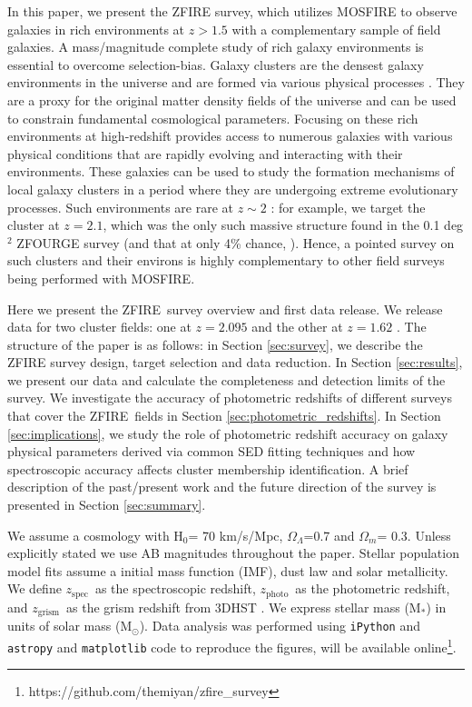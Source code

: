 \documentclass[iop]{emulateapj}
\newcommand{\zspec}{$z_{\mathrm{spec}}$}
\newcommand{\zgrism}{$z_{\mathrm{grism}}$}
\newcommand{\zphoto}{$z_{\mathrm{photo}}$}
\begin{document}
In this paper, we present the ZFIRE survey, which utilizes MOSFIRE to  observe galaxies in rich environments at $z>1.5$ with a complementary sample of field galaxies. A mass/magnitude complete study of rich galaxy environments is essential to overcome selection-bias.
Galaxy clusters are the densest galaxy environments in the universe and are formed via various physical processes \citep{Kravtsov2012}. 
They are a proxy for the original matter density fields of the universe and can be used to constrain fundamental cosmological parameters. Focusing on these rich environments at high-redshift provides access to numerous galaxies with various physical conditions that are rapidly evolving and interacting with their environments. 
These galaxies can be used to study the formation mechanisms of local galaxy clusters in a period where they are undergoing extreme evolutionary processes. Such environments are rare at $z\sim 2$ \citep{Gobat2011,Newman2014,Yuan2014}: for example, we target the \cite{Spitler2012} cluster at $z=2.1$, which was the only such massive structure found in the 0.1 deg$^2$  ZFOURGE survey (and that at only  4\% chance, \citep{Yuan2014}). Hence, a pointed survey on such clusters and their environs is highly complementary to  other field surveys being performed with MOSFIRE.


Here we present the ZFIRE\ survey overview and  first data release. 
We release data for two cluster fields: one at $z=2.095$ \citep{Spitler2012,Yuan2014} and the other at $z=1.62$ \citep{Papovich2010,Tanaka2010}. 
The structure of the paper is as follows: 
in Section \ref{sec:survey}, we describe the ZFIRE survey design, target selection and data reduction.  
In Section \ref{sec:results}, we present our data and calculate the completeness and detection limits of the survey. 
We investigate the accuracy of photometric redshifts  of different surveys that cover the ZFIRE\ fields in Section \ref{sec:photometric_redshifts}. In Section \ref{sec:implications}, we  study the role of photometric redshift accuracy on galaxy physical parameters derived via common SED fitting techniques and how spectroscopic accuracy affects cluster membership identification. 
A brief description of the past/present work and the future direction of the survey is presented in Section \ref{sec:summary}. 
 


We assume a cosmology with H$_0$= 70 km/s/Mpc, $\Omega_\Lambda$=0.7 and $\Omega_m$= 0.3. 
Unless explicitly stated we use AB magnitudes throughout the paper. 
Stellar population model fits assume a \citet{Chabrier2003} initial mass function (IMF), \citet{Calzetti2001} dust law and solar metallicity.  We define \zspec\ as the spectroscopic redshift, \zphoto\ as the photometric redshift, and \zgrism\ as the grism redshift from 3DHST \citep{Momcheva2015}. We express stellar mass (M$_*$) in units of solar mass (M$_\odot$).  
Data analysis was performed using \texttt{iPython} \citep{Perez2007} and \texttt{astropy} \citep{Astropy2013} and \texttt{matplotlib} \citep{Hunter2007} code to reproduce the figures, will be available online\footnote{https://github.com/themiyan/zfire\_survey}. 
\end{document}
